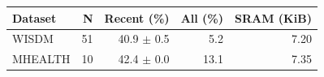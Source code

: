 \begin{tabular}{lrrrr}
\toprule
Dataset & N & Recent (\%) & All (\%) & SRAM (KiB) \\
\midrule
WISDM & 51 & 40.9 $\pm$ 0.5 & 5.2 & 7.20 \\
MHEALTH & 10 & 42.4 $\pm$ 0.0 & 13.1 & 7.35 \\
\bottomrule
\end{tabular}
